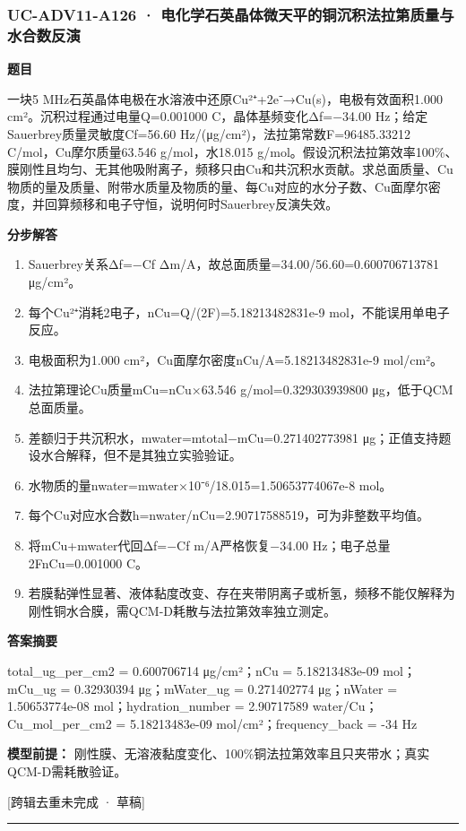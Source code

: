 \documentclass[UTF8,11pt,a4paper]{ctexart}
\begin{document}
\subsubsection*{UC-ADV11-A126 · 电化学石英晶体微天平的铜沉积法拉第质量与水合数反演}
\noindent\textbf{题目}\par
一块5 MHz石英晶体电极在水溶液中还原Cu²⁺+2e⁻→Cu(s)，电极有效面积1.000 cm²。沉积过程通过电量Q=0.001000 C，晶体基频变化Δf=−34.00 Hz；给定Sauerbrey质量灵敏度Cf=56.60 Hz/(μg/cm²)，法拉第常数F=96485.33212 C/mol，Cu摩尔质量63.546 g/mol，水18.015 g/mol。假设沉积法拉第效率100\%、膜刚性且均匀、无其他吸附离子，频移只由Cu和共沉积水贡献。求总面质量、Cu物质的量及质量、附带水质量及物质的量、每Cu对应的水分子数、Cu面摩尔密度，并回算频移和电子守恒，说明何时Sauerbrey反演失效。\par
\medskip\noindent\textbf{分步解答}
\begin{enumerate}
\item Sauerbrey关系Δf=−Cf Δm/A，故总面质量=34.00/56.60=0.600706713781 μg/cm²。
\item 每个Cu²⁺消耗2电子，nCu=Q/(2F)=5.18213482831e-9 mol，不能误用单电子反应。
\item 电极面积为1.000 cm²，Cu面摩尔密度nCu/A=5.18213482831e-9 mol/cm²。
\item 法拉第理论Cu质量mCu=nCu×63.546 g/mol=0.329303939800 μg，低于QCM总面质量。
\item 差额归于共沉积水，mwater=mtotal−mCu=0.271402773981 μg；正值支持题设水合解释，但不是其独立实验验证。
\item 水物质的量nwater=mwater×10⁻⁶/18.015=1.50653774067e-8 mol。
\item 每个Cu对应水合数h=nwater/nCu=2.90717588519，可为非整数平均值。
\item 将mCu+mwater代回Δf=−Cf m/A严格恢复−34.00 Hz；电子总量2FnCu=0.001000 C。
\item 若膜黏弹性显著、液体黏度改变、存在夹带阴离子或析氢，频移不能仅解释为刚性铜水合膜，需QCM-D耗散与法拉第效率独立测定。
\end{enumerate}
\noindent\textbf{答案摘要}\par
total\_ug\_per\_cm2 = 0.600706714 μg/cm²；nCu = 5.18213483e-09 mol；mCu\_ug = 0.32930394 μg；mWater\_ug = 0.271402774 μg；nWater = 1.50653774e-08 mol；hydration\_number = 2.90717589 water/Cu；Cu\_mol\_per\_cm2 = 5.18213483e-09 mol/cm²；frequency\_back = -34 Hz\par
\noindent\textbf{模型前提：}
刚性膜、无溶液黏度变化、100\%铜法拉第效率且只夹带水；真实QCM-D需耗散验证。\par
\noindent\textcolor{red!65!black}{[跨辑去重未完成 · 草稿]} \par
\medskip\hrule\medskip
{}
\end{document}
